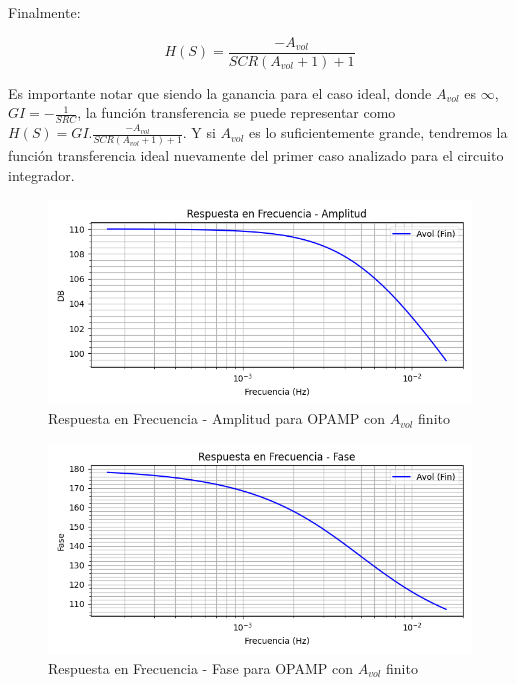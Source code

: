 Finalmente:

$$H(S)= \frac{-A_{vol}}{SCR(A_{vol}+1)+1}$$

Es importante notar que siendo la ganancia para el caso ideal, donde $A_{vol}$ es $\infty$, $ GI = - \frac{1}{SRC}$,  la función
transferencia se puede representar como $H(S) = GI. \frac{-A_{vol}}{SCR(A_{vol}+1)+1}$. Y
si $A_{vol}$ es lo suficientemente grande, tendremos la función transferencia ideal nuevamente del primer caso analizado para el circuito integrador.

\begin{figure}[H]
    \centering 
    \includegraphics [scale=1] {../Ejercicio3-CircuitoIntegradoresyDerivadores/Imagenes/teorico-avol-fin-integrador-amplitud.png} 
    \caption{Respuesta en Frecuencia - Amplitud para OPAMP con $A_{vol}$ finito}
    \label{fig:emptyPlotTool}
\end{figure}

\begin{figure}[H]
    \centering 
    \includegraphics [scale=1] {../Ejercicio3-CircuitoIntegradoresyDerivadores/Imagenes/teorico-avol-fin-integrador-fase.png} 
    \caption{Respuesta en Frecuencia - Fase para OPAMP con $A_{vol}$ finito}
    \label{fig:emptyPlotTool}
\end{figure}


